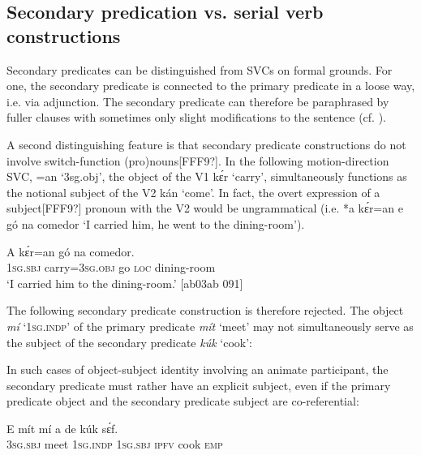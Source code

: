 \subsection{Secondary predication vs. serial verb constructions}

Secondary predicates can be distinguished from SVCs on formal grounds. For one, the secondary predicate is connected to the primary predicate in a loose way, i.e. via adjunction. The secondary predicate can therefore be paraphrased by fuller clauses with sometimes only slight modifications to the sentence (cf. ).


A second distinguishing feature is that secondary predicate constructions do not involve switch-function (pro)nouns[FFF9?]. In the following motion-direction SVC, =an ‘3sg.obj’, the object of the V1 kɛ́r ‘carry’, simultaneously functions as the notional subject of the V2 kán ‘come’. In fact, the overt expression of a subject[FFF9?] pronoun with the V2 would be ungrammatical (i.e. *a kɛ́r=an e gó na comedor ‘I carried him, he went to the dining-room’). 



\ea%
    \label{ex:key:1586}
    \gll A    kɛ́r=an      gó  na  comedor.\\
\textsc{1sg.sbj}  carry=\textsc{3sg.obj}    go  \textsc{loc}  dining-room\\

\glt ‘I carried him to the dining-room.’ [ab03ab 091]
\z

The following secondary predicate construction is therefore rejected. The object \textit{mí} ‘\textsc{1sg.indp}’ of the primary predicate \textit{mít} ‘meet’ may not simultaneously serve as the subject of the secondary predicate \textit{kúk} ‘cook’:


\z

In such cases of object-subject identity involving an animate participant, the secondary predicate must rather have an explicit subject, even if the primary predicate object and the secondary predicate subject are co-referential: 


\ea%
    \label{ex:key:1588}
    \gll E    mít    mí    a    de  kúk    sɛ́f.\\
\textsc{3sg.sbj}  meet  \textsc{1sg.indp}  \textsc{1sg.sbj}  \textsc{ipfv}  cook  \textsc{emp}\\


